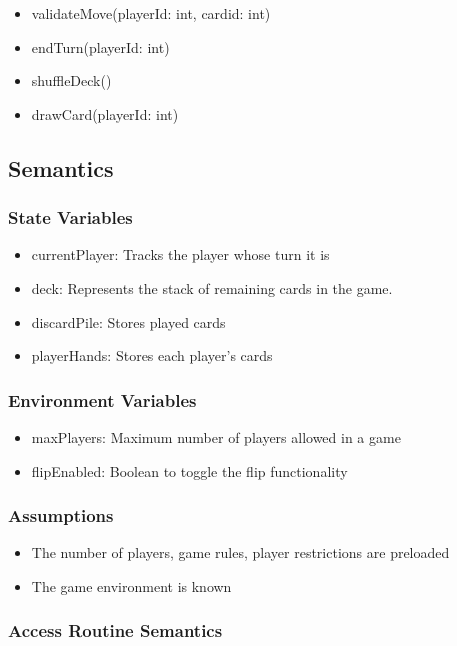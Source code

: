 \documentclass[12pt, titlepage]{article}
\begin{document}
\begin{itemize}
\item validateMove(playerId: int, cardid: int)
\item endTurn(playerId: int)
\item shuffleDeck()
\item drawCard(playerId: int)
\end{itemize}

\subsection{Semantics}

\subsubsection{State Variables}
\begin{itemize}
\item currentPlayer: Tracks the player whose turn it is
\item deck: Represents the stack of remaining cards in the game.
\item discardPile: Stores played cards
\item playerHands: Stores each player's cards
\end{itemize}

\subsubsection{Environment Variables}
\begin{itemize}
\item maxPlayers: Maximum number of players allowed in a game
\item flipEnabled: Boolean to toggle the flip functionality
\end{itemize}

\subsubsection{Assumptions}
\begin{itemize}
\item The number of players, game rules, player restrictions are preloaded
\item The game environment is known
\end{itemize}

\subsubsection{Access Routine Semantics}
\end{document}
